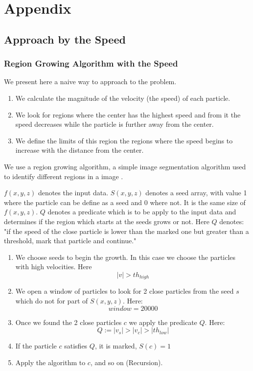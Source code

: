 \documentclass[12pt]{article}
\begin{document}



\appendix
\section{Appendix}
\subsection{Approach by the Speed} 
\label{App:App_Speed}
\subsubsection{Region Growing Algorithm with the Speed}

We present here a naive way to approach to the problem. 
\begin{enumerate}
	\item We calculate the magnitude of the velocity (the speed) of each particle. 
	\item We look for regions where the center has the highest speed and from it the speed decreases while the particle is further away from the center. 
    \item We define the limits of this region the regions where the speed begins to increase with the distance from the center.
\end{enumerate}

\begin{par}
We use a region growing algorithm, a simple image segmentation algorithm
used to identify different regions in a image \cite{gonzalez_digital_2008}.
\end{par}

\begin{par}
$f(x,y,z)$ denotes the input data. $S(x,y,z)$ denotes a seed array, with
value 1 where the particle can be define as a seed and 0 where not. It is the
same size of $f(x,y,z)$. $Q$ denotes a predicate which is to be apply to the
input data and determines if the region which
 starts at the seeds grows or
not. Here $Q$ denotes: "if the speed of the close
 particle is lower than the
marked one but greater than a threshold, mark that
 particle and continue."
\end{par}

\begin{enumerate}
	\item We choose seeds to begin the growth. In
	 this case we choose the particles with high
	  velocities. Here \[ |v|>  th_{high}\]
	\item We open a window of particles to look
	 for 2 close particles from the seed $s$ which
	  do not for part of $S(x,y,z)$. Here:
    \[ window = 20000\]
    \item Once we found the 2 close particles $c$ we apply the predicate $Q$. Here:
    \[ Q := |v_s| > |v_c| > |th_{low}|\]
    
    \item If the particle $c$ satisfies $Q$, it is
     marked, $S(c) = 1$
    \item Apply the algorithm to $c$, and so on
     (Recursion).
\end{enumerate}
\end{document}
